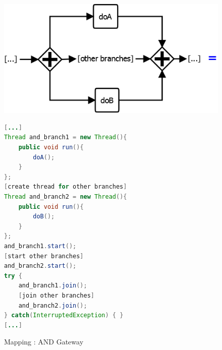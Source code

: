 \begin{figure}[h]%
\begin{minipage}[c]{0.5\textwidth} 
\includegraphics[width=0.95\linewidth]{images/mapping/and-gateway.png}
\end{minipage}
\begin{minipage}[c]{0.5\textwidth} 
\begin{lstlisting}[language=Java]
[...]
Thread and_branch1 = new Thread(){
	public void run(){
		doA();
	}
};
[create thread for other branches]
Thread and_branch2 = new Thread(){
	public void run(){
		doB();
	}
};
and_branch1.start();
[start other branches]
and_branch2.start();
try {
	and_branch1.join();
	[join other branches]
	and_branch2.join();
} catch(InterruptedException) { }
[...]
\end{lstlisting}
\end{minipage}
\caption{Mapping : AND Gateway}%
\label{fig:mapping_AND}%
\end{figure}



